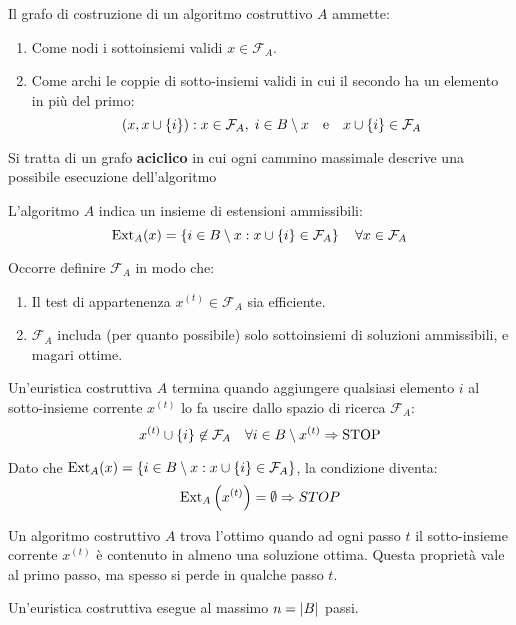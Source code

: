 \documentclass[\main/main.tex]{subfiles}
\providecommand{\f}{\mathcal{F}}
\providecommand{\fa}{\f_A}
\begin{document}
\begin{multicols}{2}
\begin{definition}
\begin{enumerate}
    \end{enumerate}
\end{definition}
\begin{definition}
Il grafo di costruzione di un algoritmo costruttivo \(A\) ammette:
\begin{enumerate}
    \item Come nodi i sottoinsiemi validi \(x \in \fa\).
    \item Come archi le coppie di sotto-insiemi validi in cui il secondo ha un elemento in più del primo:
    \[
        \rnd{x, x \cup \crl{i}}: x \in \fa, \; i \in B \setminus x \quad \text{e} \quad x \cup \crl{i} \in \fa
    \]
\end{enumerate}

Si tratta di un grafo \textbf{aciclico} in cui ogni cammino massimale descrive una possibile esecuzione dell'algoritmo
\end{definition}
\begin{observation}
    L'algoritmo \(A\) indica un insieme di estensioni ammissibili:
    \[
        \text{Ext}_A(x) = \crl{i \in B \setminus x: x \cup \crl{i} \in \fa} \quad \forall x \in \fa 
    \]
\end{observation}
\begin{definition}
    Occorre definire \(\fa\) in modo che:
    \begin{enumerate}
        \item Il test di appartenenza \(x^{(t)} \in \fa\) sia efficiente.
        \item \(\fa\) includa (per quanto possibile) solo sottoinsiemi di soluzioni ammissibili, e magari ottime.
    \end{enumerate}
\end{definition}
\begin{observation}
    Un'euristica costruttiva \(A\) termina quando aggiungere qualsiasi elemento \(i\) al sotto-insieme corrente \(x^{(t)}\) lo fa uscire dallo spazio di ricerca \(\fa\):
    \[
        x^{(t)} \cup \crl{i} \not\in \fa \quad \forall i \in B \setminus x^{(t)} \Rightarrow \text{STOP}
    \]
    
    Dato che \(\text{Ext}_A(x) = \crl{i \in B\setminus x: x \cup \crl{i} \in \fa}\), la condizione diventa:
    \[
        \text{Ext}_A\left(x^{(t)}\right) = \emptyset \Rightarrow STOP
    \]
\end{observation}
\begin{observation}
    Un algoritmo costruttivo \(A\) trova l'ottimo quando ad ogni passo \(t\) il sotto-insieme corrente \(x^{(t)}\) è contenuto in almeno una soluzione ottima. Questa proprietà vale al primo passo, ma spesso si perde in qualche passo \(t\).
\end{observation}
\begin{observation}
    Un'euristica costruttiva esegue al massimo \(n = \left\lvert B\right\rvert\) passi.
\end{observation}
\end{multicols}
\end{document}
